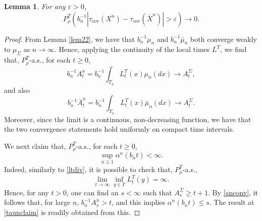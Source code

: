 \documentclass[a4paper, 11pt]{article}
\newtheorem{lem}[theorem]{Lemma}
\begin{document}
\begin{lem}\label{lem42} For any $\varepsilon>0$,
\[P^T_{\rho}\left(b_n^{-1}\left|\tau_{\mathrm{cov}}({X}^n)-\tau_{\mathrm{cov}}(\bar{X}^n)\right|>\varepsilon\right)\rightarrow 0.\]
\end{lem}
\begin{proof}
From Lemma \ref{lem22}, we have that $b_n^{-1}\mu_n$ and $b_n^{-1}\bar\mu_n$ both converge weakly to $\mu_{\Sigma}$ as $n\rightarrow\infty$. Hence, applying the continuity of the local times $L^T$, we find that, $P^T_{\rho}$-a.s., for each $t\geq 0$,
\begin{equation}\label{anconv}
b_n^{-1}A^n_t=b_n^{-1}\int_{T_n}L^T_t(x)\mu_n(dx)\rightarrow A^{\Sigma}_t,
\end{equation}
and also
\begin{equation}\label{baranconv}
b_n^{-1}\bar{A}^n_t=b_n^{-1}\int_{T_n}L^T_t(x)\bar{\mu}_n(dx)\rightarrow A^{\Sigma}_t.
\end{equation}
Moreover, since the limit is a continuous, non-decreasing function, we have that the two convergence statements hold uniformly on compact time intervals.

We next claim that, $P^T_{\rho}$-a.s., for each $t\geq 0$,
\begin{equation}\label{taunclaim}
\sup_{n\geq 1}\alpha^n(b_nt)<\infty.
\end{equation}
Indeed, similarly to \eqref{ltdiv}, it is possible to check that, $P^T_{\rho}$-a.s.,
\[\lim_{t\rightarrow\infty}\inf_{y\in T}L^T_t(y)=\infty.\]
Hence, for any $t>0$, one can find an $s<\infty$ such that $A^\Sigma_s\geq t+1$. By \eqref{anconv}, it follows that, for large $n$, $b_n^{-1}A^n_s> t$, and this implies $\alpha^n(b_n t)\leq s$. The result at \eqref{taunclaim} is readily obtained from this.


\end{proof}
\end{document}

